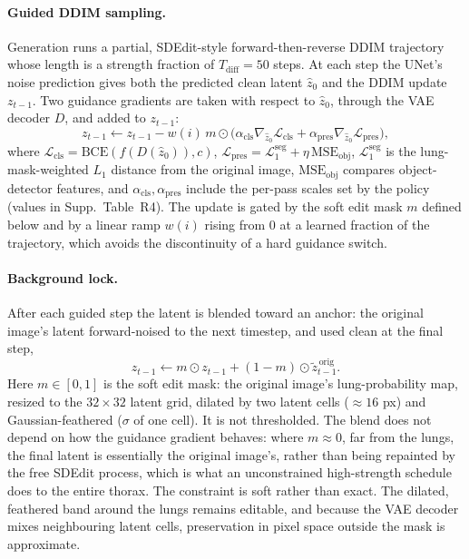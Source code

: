 \paragraph{Guided DDIM sampling.} Generation runs a partial, SDEdit-style forward-then-reverse DDIM trajectory whose length is a strength fraction of $T_{\text{diff}} = 50$ steps. At each step the UNet's noise prediction gives both the predicted clean latent $\hat{z}_0$ and the DDIM update $z_{t-1}$. Two guidance gradients are taken with respect to $\hat{z}_0$, through the VAE decoder $D$, and added to $z_{t-1}$:
\begin{equation}
z_{t-1} \leftarrow z_{t-1} - w(i)\, m \odot \big(\alpha_{\text{cls}}\nabla_{\hat{z}_0}\mathcal{L}_{\text{cls}} + \alpha_{\text{pres}}\nabla_{\hat{z}_0}\mathcal{L}_{\text{pres}}\big),
\label{eq:guidance}
\end{equation}
where $\mathcal{L}_{\text{cls}} = \mathrm{BCE}(f(D(\hat{z}_0)), c)$, $\mathcal{L}_{\text{pres}} = \mathcal{L}_1^{\text{seg}} + \eta\,\mathrm{MSE}_{\text{obj}}$, $\mathcal{L}_1^{\text{seg}}$ is the lung-mask-weighted $L_1$ distance from the original image, $\mathrm{MSE}_{\text{obj}}$ compares object-detector features, and $\alpha_{\text{cls}}, \alpha_{\text{pres}}$ include the per-pass scales set by the policy (values in Supp.~Table~R4). The update is gated by the soft edit mask $m$ defined below and by a linear ramp $w(i)$ rising from 0 at a learned fraction of the trajectory, which avoids the discontinuity of a hard guidance switch.

\paragraph{Background lock.} After each guided step the latent is blended toward an anchor: the original image's latent forward-noised to the next timestep, and used clean at the final step,
\begin{equation}
z_{t-1} \leftarrow m \odot z_{t-1} + (1 - m) \odot \tilde{z}^{\,\text{orig}}_{t-1}.
\label{eq:lock}
\end{equation}
Here $m \in [0, 1]$ is the soft edit mask: the original image's lung-probability map, resized to the $32 \times 32$ latent grid, dilated by two latent cells ($\approx 16$ px) and Gaussian-feathered ($\sigma$ of one cell). It is not thresholded. The blend does not depend on how the guidance gradient behaves: where $m \approx 0$, far from the lungs, the final latent is essentially the original image's, rather than being repainted by the free SDEdit process, which is what an unconstrained high-strength schedule does to the entire thorax. The constraint is soft rather than exact. The dilated, feathered band around the lungs remains editable, and because the VAE decoder mixes neighbouring latent cells, preservation in pixel space outside the mask is approximate.

